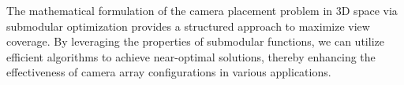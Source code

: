 
The mathematical formulation of the camera placement problem in 3D space via submodular optimization provides a structured approach to maximize view coverage. By leveraging the properties of submodular functions, we can utilize efficient algorithms to achieve near-optimal solutions, thereby enhancing the effectiveness of camera array configurations in various applications.


